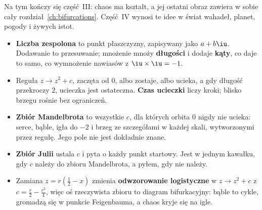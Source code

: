 \noindent
Na tym kończy się część~III: chaos ma kształt, a jej ostatni obraz zawiera
w sobie cały rozdział~\ref{ch:bifurcations}. Część~IV wynosi te idee w świat
wahadeł, planet, pogody i żywych istot.

\begin{summarybox}
\begin{itemize}
\item \textbf{Liczba zespolona} to punkt płaszczyzny, zapisywany jako $a +
  b\iu$. Dodawanie to przesuwanie; mnożenie mnoży \textbf{długości} i dodaje
  \textbf{kąty}, co daje to samo, co wymnożenie nawiasów z
  $\iu \times \iu = -1$.
\item Reguła $z \to z^{2} + c$, zaczęta od $0$, albo zostaje, albo ucieka, a
  gdy długość przekroczy $2$, ucieczka jest ostateczna. \textbf{Czas
  ucieczki} liczy kroki; blisko brzegu rośnie bez ograniczeń.
\item \textbf{Zbiór Mandelbrota} to wszystkie $c$, dla których orbita $0$
  nigdy nie ucieka: serce, bąble, igła do $-2$ i brzeg ze szczegółami w
  każdej skali, wytworzonymi przez regułę. Jego pole nie jest dokładnie
  znane.
\item \textbf{Zbiór Julii} ustala $c$ i pyta o każdy punkt startowy. Jest w
  jednym kawałku, gdy $c$ należy do zbioru Mandelbrota, a pyłem, gdy nie
  należy.
\item Zamiana $z = r(\tfrac12 - x)$ zmienia \textbf{odwzorowanie
  logistyczne} w $z \to z^{2} + c$ z $c = \tfrac{r}{2} - \tfrac{r^{2}}{4}$,
  więc oś rzeczywista zbioru to diagram bifurkacyjny: bąble to cykle,
  gromadzą się w punkcie Feigenbauma, a chaos kryje się na igle.
\end{itemize}
\end{summarybox}

\canyou

